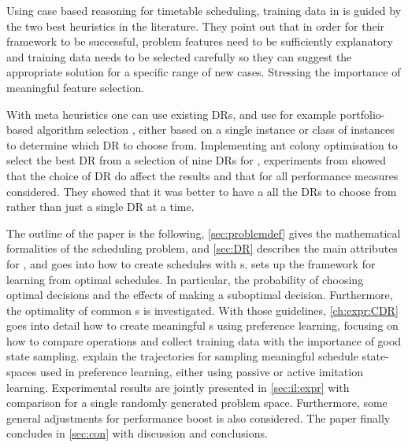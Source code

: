 \documentclass[twocolumn]{svjour3}
\begin{document}
Using case based reasoning for timetable scheduling, training data in 
\cite{Burke06} is guided by the two best heuristics in the literature.
They point out that in order for their framework to be successful, problem 
features need to be sufficiently explanatory and training data needs to be 
selected carefully so they can suggest the appropriate solution for a specific 
range of new cases. Stressing the importance of meaningful feature selection. 


With meta heuristics one can use existing DRs, and use for example 
portfolio-based algorithm selection \cite{Rice76,Gomes01,Xu07}, either based on 
a single instance or class of instances to determine which DR to choose from. 
Implementing ant colony optimisation to select the best DR 
from a selection of nine DRs for \JSP, experiments from \cite{Korytkowski13} 
showed that the choice of DR do affect the results and that for all performance 
measures considered. They showed that it was better to have a all the DRs to 
choose from rather than just a single DR at a time.


The outline of the paper is the following, \cref{sec:problemdef} gives the 
mathematical formalities of the scheduling problem, and  
\cref{sec:DR} describes the main attributes for \jsp, 
and goes into how to create schedules with \dr s. 
 sets up the framework for learning from optimal schedules. 
In particular, the probability of choosing optimal decisions and the effects of 
making a suboptimal decision. Furthermore, the optimality of common \sdr s is 
investigated.
With those guidelines, \cref{ch:expr:CDR} goes into detail how to create 
meaningful \cdr s using preference learning, focusing on how to 
compare operations and collect training data with the importance of good state 
sampling. 
 explain the trajectories for 
sampling meaningful schedule state-spaces used in preference learning, either 
using passive or active imitation learning. 
Experimental results are jointly presented in \cref{sec:il:expr} with 
comparison for a single randomly generated problem space. Furthermore, some 
general adjustments for performance boost is also considered.
The paper finally concludes in \cref{sec:con} with discussion and conclusions.
\end{document}
